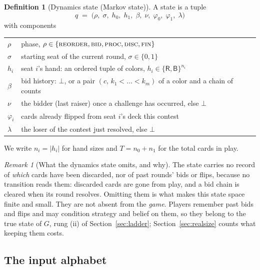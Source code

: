 \documentclass[11pt]{article}
\theoremstyle{plain}
\theoremstyle{definition}
\newtheorem{definition}[theorem]{Definition}
\theoremstyle{remark}
\newtheorem{remark}[theorem]{Remark}
\newcommand{\R}{\ensuremath{\mathsf{R}}}
\newcommand{\B}{\ensuremath{\mathsf{B}}}
\begin{document}
\begin{definition}[Dynamics state (Markov state)]\label{def:state}
A state is a tuple
\[
  q \;=\; \bigl(\rho,\; \sigma,\; h_0,\; h_1,\; \beta,\; \nu,\;
                 \varphi_0,\; \varphi_1,\; \lambda \bigr)
\]
with components
\begin{center}
\begin{tabular}{@{}ll@{}}
\toprule
$\rho$ & phase, $\rho\in\{\textsc{reorder},\textsc{bid},\textsc{proc},\textsc{disc},\textsc{fin}\}$\\
$\sigma$ & starting seat of the current round, $\sigma\in\{0,1\}$\\
$h_i$ & seat $i$'s hand: an ordered tuple of colors, $h_i\in\{\R,\B\}^{n_i}$\\
$\beta$ & bid history: $\bot$, or a pair $(c,\,k_1<\dots<k_m)$ of a color and a chain of counts\\
$\nu$ & the bidder (last raiser) once a challenge has occurred, else $\bot$\\
$\varphi_i$ & cards already flipped from seat $i$'s deck this contest\\
$\lambda$ & the loser of the contest just resolved, else $\bot$\\
\bottomrule
\end{tabular}
\end{center}
We write $n_i=|h_i|$ for hand sizes and $T=n_0+n_1$ for the total cards in
play.
\end{definition}

\begin{remark}[What the dynamics state omits, and why]\label{rem:absent}
The state carries no record of \emph{which} cards have been discarded, nor
of past rounds' bids or flips, because no transition reads them: discarded
cards are gone from play, and a bid chain is cleared when its round
resolves. Omitting them is what makes this state space finite and small.
They are not absent from the \emph{game}. Players remember past bids and
flips and may condition strategy and belief on them, so they belong to the
true state of $G$, rung (ii) of Section~\ref{sec:ladder};
Section~\ref{sec:realsize} counts what keeping them costs.
\end{remark}

\subsection{The input alphabet}
\end{document}
